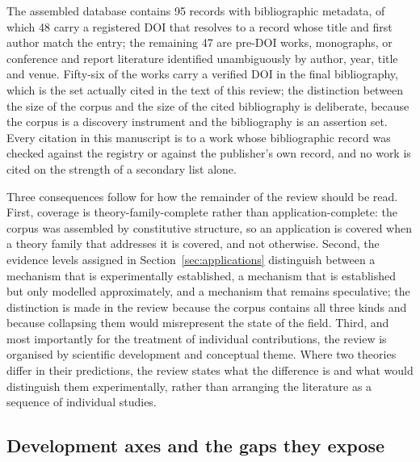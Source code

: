 The assembled database contains 95 records with bibliographic metadata, of which 48 carry a registered DOI that resolves to a record whose title and first author match the entry; the remaining 47 are pre-DOI works, monographs, or conference and report literature identified unambiguously by author, year, title and venue. Fifty-six of the works carry a verified DOI in the final bibliography, which is the set actually cited in the text of this review; the distinction between the size of the corpus and the size of the cited bibliography is deliberate, because the corpus is a discovery instrument and the bibliography is an assertion set. Every citation in this manuscript is to a work whose bibliographic record was checked against the registry or against the publisher's own record, and no work is cited on the strength of a secondary list alone.

Three consequences follow for how the remainder of the review should be read. First, coverage is theory-family-complete rather than application-complete: the corpus was assembled by constitutive structure, so an application is covered when a theory family that addresses it is covered, and not otherwise. Second, the evidence levels assigned in Section~\ref{sec:applications} distinguish between a mechanism that is experimentally established, a mechanism that is established but only modelled approximately, and a mechanism that remains speculative; the distinction is made in the review because the corpus contains all three kinds and because collapsing them would misrepresent the state of the field. Third, and most importantly for the treatment of individual contributions, the review is organised by scientific development and conceptual theme. Where two theories differ in their predictions, the review states what the difference is and what would distinguish them experimentally, rather than arranging the literature as a sequence of individual studies.

\subsection{Development axes and the gaps they expose}

